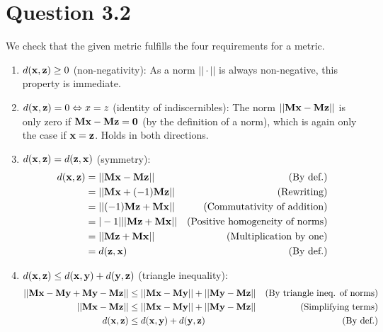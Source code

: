 \documentclass[a4paper, oneside, final]{memoir}
\begin{document}
\newpage
\section*{Question 3.2}

We check that the given metric fulfills the four requirements for a metric.

\begin{enumerate}
\item $d(\bold{x},\bold{z}) \geq 0$ (non-negativity): As a norm
  $||\cdot||$ is always non-negative, this property is immediate.
\item $d(\bold{x},\bold{z}) = 0 \Leftrightarrow x=z$ (identity of
  indiscernibles): The norm $||\bold{Mx}-\bold{Mz}||$ is only zero if
  $\bold{Mx}-\bold{Mz}=\bold{0}$ (by the definition of a norm), which
  is again only the case if $\bold{x}=\bold{z}$.  Holds in both
  directions.
\item $d(\bold{x},\bold{z}) = d(\bold{z},\bold{x})$ (symmetry):
  \begin{align*}
    d(\bold{x},\bold{z})&=||\bold{Mx}-\bold{Mz}||&\text{(By def.)} \\
    &=||\bold{Mx}+(-1)\bold{Mz}||&\text{(Rewriting)} \\
    &=||(-1)\bold{Mz}+\bold{Mx}||&\text{(Commutativity of addition)} \\
    &=|-1|||\bold{Mz}+\bold{Mx}||&\text{(Positive homogeneity of norms)} \\
    &=||\bold{Mz}+\bold{Mx}||&\text{(Multiplication by one)} \\
    &=d(\bold{z},\bold{x})&\text{(By def.)}
\end{align*}
\item $d(\bold{x}, \bold{z}) \leq d(\bold{x}, \bold{y}) + d(\bold{y},
  \bold{z})$ (triangle inequality):
  \begin{align*}
    ||\bold{Mx}-\bold{My}+\bold{My}-\bold{Mz}|| &\leq ||\bold{Mx}-\bold{My}|| + ||\bold{My}-\bold{Mz}||&\text{(By triangle ineq. of norms)}\\
    ||\bold{Mx}-\bold{Mz}|| &\leq ||\bold{Mx}-\bold{My}|| + ||\bold{My}-\bold{Mz}||&\text{(Simplifying terms)}\\
    d(\bold{x}, \bold{z}) &\leq d(\bold{x}, \bold{y}) + d(\bold{y}, \bold{z})&\text{(By def.)}
  \end{align*}
\end{enumerate}
\end{document}
